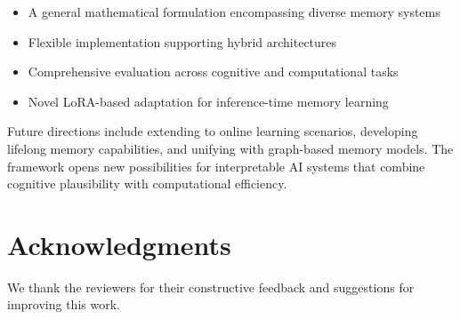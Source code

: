 \documentclass[11pt]{article}
\begin{document}
\begin{itemize}
\item A general mathematical formulation encompassing diverse memory systems
\item Flexible implementation supporting hybrid architectures
\item Comprehensive evaluation across cognitive and computational tasks
\item Novel LoRA-based adaptation for inference-time memory learning
\end{itemize}

Future directions include extending to online learning scenarios, developing lifelong memory capabilities, and unifying with graph-based memory models. The framework opens new possibilities for interpretable AI systems that combine cognitive plausibility with computational efficiency.

\section*{Acknowledgments}

We thank the reviewers for their constructive feedback and suggestions for improving this work.
\end{document}
